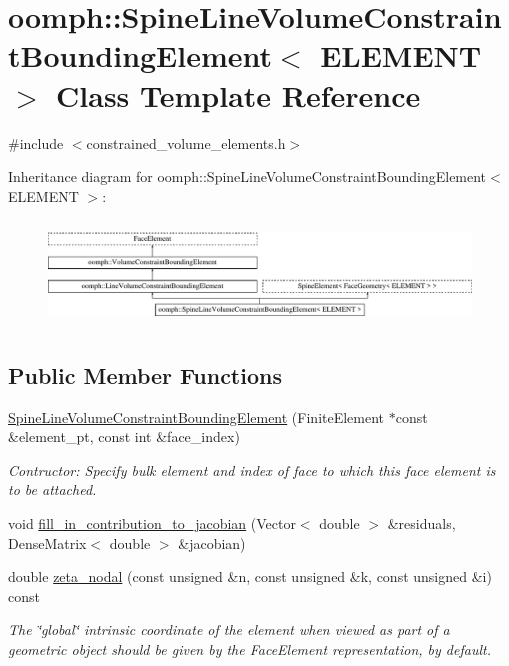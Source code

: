 \hypertarget{classoomph_1_1SpineLineVolumeConstraintBoundingElement}{}\section{oomph\+:\+:Spine\+Line\+Volume\+Constraint\+Bounding\+Element$<$ E\+L\+E\+M\+E\+NT $>$ Class Template Reference}
\label{classoomph_1_1SpineLineVolumeConstraintBoundingElement}


{\ttfamily \#include $<$constrained\+\_\+volume\+\_\+elements.\+h$>$}

Inheritance diagram for oomph\+:\+:Spine\+Line\+Volume\+Constraint\+Bounding\+Element$<$ E\+L\+E\+M\+E\+NT $>$\+:\begin{figure}[H]
\begin{center}
\leavevmode
\includegraphics[height=2.821159cm]{classoomph_1_1SpineLineVolumeConstraintBoundingElement}
\end{center}
\end{figure}
\subsection*{Public Member Functions}
\begin{DoxyCompactItemize}
\item 
\hyperlink{classoomph_1_1SpineLineVolumeConstraintBoundingElement_a5b8bb4a60ee78615103eb6b9fa3eb397}{Spine\+Line\+Volume\+Constraint\+Bounding\+Element} (Finite\+Element $\ast$const \&element\+\_\+pt, const int \&face\+\_\+index)
\begin{DoxyCompactList}\small\item\em Contructor\+: Specify bulk element and index of face to which this face element is to be attached. \end{DoxyCompactList}\item 
void \hyperlink{classoomph_1_1SpineLineVolumeConstraintBoundingElement_a9b23d5b98dc459a918045d2a8e221728}{fill\+\_\+in\+\_\+contribution\+\_\+to\+\_\+jacobian} (Vector$<$ double $>$ \&residuals, Dense\+Matrix$<$ double $>$ \&jacobian)
\item 
double \hyperlink{classoomph_1_1SpineLineVolumeConstraintBoundingElement_ab299a1b0cec3d35f5bd6ef683a244db6}{zeta\+\_\+nodal} (const unsigned \&n, const unsigned \&k, const unsigned \&i) const
\begin{DoxyCompactList}\small\item\em The \char`\"{}global\char`\"{} intrinsic coordinate of the element when viewed as part of a geometric object should be given by the Face\+Element representation, by default. \end{DoxyCompactList}\end{DoxyCompactItemize}
